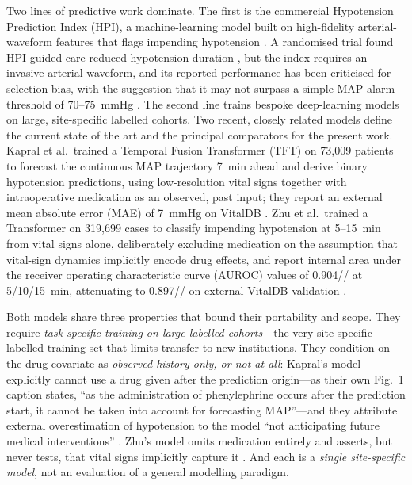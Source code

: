 \documentclass[11pt]{article}
\begin{document}
Two lines of predictive work dominate. The first is the commercial
Hypotension Prediction Index (HPI), a machine-learning model built on
high-fidelity arterial-waveform features that flags impending hypotension
\citep{Hatib2018,Davies2020}. A randomised trial found HPI-guided care
reduced hypotension duration \citep{Wijnberge2020}, but the index requires
an invasive arterial waveform, and its reported performance has been
criticised for selection bias, with the suggestion that it may not surpass a
simple MAP alarm threshold of 70--75~mmHg
\citep{Enevoldsen2022,Vistisen2024}. The second line trains bespoke
deep-learning models on large, site-specific labelled cohorts. Two recent,
closely related models define the current state of the art and the principal comparators for
the present work. Kapral et al.\ trained a Temporal Fusion Transformer (TFT)
on 73{,}009 patients to forecast the continuous MAP trajectory 7~min ahead
and derive binary hypotension predictions, using low-resolution vital signs
together with intraoperative medication as an observed, past input; they
report an external mean absolute error (MAE) of 7~mmHg on VitalDB
\citep{Kapral2024}. Zhu et al.\ trained a Transformer on 319{,}699 cases to
classify impending hypotension at 5--15~min from vital signs alone,
deliberately excluding medication on the assumption that vital-sign dynamics
implicitly encode drug effects, and report internal area under the receiver
operating characteristic curve (AUROC) values of 0.904// at
5/10/15~min, attenuating to 0.897// on external VitalDB validation
\citep{Zhu2026}.

Both models share three properties that bound their portability and scope.
They require \emph{task-specific training on large labelled cohorts}---the
very site-specific labelled training set that limits transfer to new
institutions. They condition on the drug covariate as \emph{observed history
only, or not at all}: Kapral's model explicitly cannot use a drug given
after the prediction origin---as their own Fig.~1 caption states, ``as the
administration of phenylephrine occurs after the prediction start, it cannot
be taken into account for forecasting MAP''---and they attribute external
overestimation of hypotension to the model ``not anticipating future medical
interventions'' \citep{Kapral2024}. Zhu's model omits medication entirely
and asserts, but never tests, that vital signs implicitly capture it
\citep{Zhu2026}. And each is a \emph{single site-specific model}, not an
evaluation of a general modelling paradigm.
\end{document}
